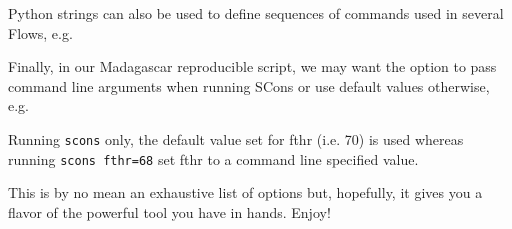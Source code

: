 Python strings can also be used to define sequences of commands used
in several Flows, e.g.



Finally, in our Madagascar reproducible script, we may want the option
to pass command line arguments when running SCons or use default
values otherwise, e.g.



Running \texttt{scons} only, the default value set for fthr (i.e. 70)
is used whereas running \texttt{scons fthr=68} set fthr to a command
line specified value.

This is by no mean an exhaustive list of options but, hopefully, it
gives you a flavor of the powerful tool you have in hands. Enjoy!

\begin{comment}
\subsection{Useful SCons commands for reproducible scripts}

On top of SCons standard options (\texttt{scons --help} for more
details), Madagascar has its own SCons options. We already saw
\texttt{scons plot.view} that displays \texttt{plot.vpl} (in the
\texttt{Fig} folder) obtained in a Result command. \texttt{scons view}
displays the result plots one after the other.

It is also possible to check parameters for Madagascar programs in
SCons Flow commands using the CHECKPAR option (\texttt{scons
  CHECKPAR=y target}). Note that CHECKPAR is an experimental option
and will be enhanced in the future to include parameter ranges and
other safety checks.

To time the execution of processing flows in a SConstruct use the
TIMER option (\texttt{scons TIMER=y target}).

\texttt{scons lock} is used to secure result plots and copy them from
the \texttt{Fig} folder of your working directory to your
\texttt{\$RSFFIGS} folder where \texttt{RSFFIGS} is the environmental
variable to the directory where you want Madagascar to put your key
Madagascar result plots. Note that this is a necessary step before
creating a reproducible documentation. \texttt{scons plot.flip} runs
\texttt{xtpen Fig/plot.vpl /locked/figures/plot.vpl} to flip between
the new and locked figure. This is useful when detecting changes.
\end{comment}

